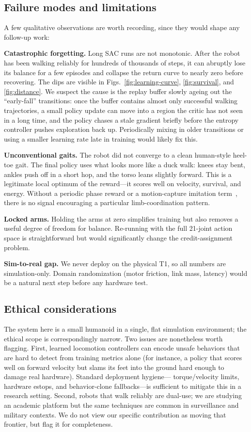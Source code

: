 \documentclass[sigconf,nonacm]{acmart}
\begin{document}
\subsection{Failure modes and limitations}
A few qualitative observations are worth recording, since they would shape any
follow-up work:

\textbf{Catastrophic forgetting.} Long SAC runs are not monotonic. After the
robot has been walking reliably for hundreds of thousands of steps, it can
abruptly lose its balance for a few episodes and collapse the return curve to
nearly zero before recovering. The dips are visible in
Figs.~\ref{fig:learning-curve}, \ref{fig:survival}, and \ref{fig:distance}. We
suspect the cause is the replay buffer slowly ageing out the
``early-fall'' transitions: once the buffer contains almost only successful
walking trajectories, a small policy update can move into a region the critic
has not seen in a long time, and the policy chases a stale gradient briefly
before the entropy controller pushes exploration back up. Periodically mixing
in older transitions or using a smaller learning rate late in training would
likely fix this.

\textbf{Unconventional gaits.} The robot did not converge to a clean
human-style heel-toe gait. The final policy uses what looks more like a duck
walk: knees stay bent, ankles push off in a short hop, and the torso leans
slightly forward. This is a legitimate local optimum of the reward---it scores
well on velocity, survival, and energy. Without a periodic phase reward or a
motion-capture imitation term~\cite{peng2018deepmimic}, there is no signal
encouraging a particular limb-coordination pattern.

\textbf{Locked arms.} Holding the arms at zero simplifies training but also
removes a useful degree of freedom for balance. Re-running with the full
21-joint action space is straightforward but would significantly change
the credit-assignment problem.

\textbf{Sim-to-real gap.} We never deploy on the physical T1, so all numbers
are simulation-only. Domain randomization (motor friction, link mass, latency)
would be a natural next step before any hardware test.

\subsection{Ethical considerations}
The system here is a small humanoid in a single, flat simulation environment;
the ethical scope is correspondingly narrow. Two issues are nonetheless
worth flagging. First, learned locomotion controllers can encode unsafe
behaviors that are hard to detect from training metrics alone (for instance, a
policy that scores well on forward velocity but slams its feet into the ground
hard enough to damage real hardware). Standard deployment hygiene---
torque/velocity limits, hardware estops, and behavior-clone fallbacks---is
sufficient to mitigate this in a research setting. Second, robots that walk
reliably are dual-use; we are studying an academic platform but the same
techniques are common in surveillance and military contexts. We do not view
our specific contribution as moving that frontier, but flag it for
completeness.
\end{document}
